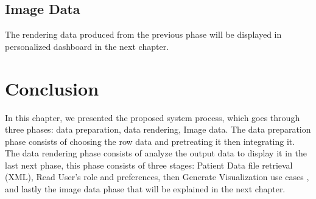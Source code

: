 \subsection{Image Data}
The rendering data produced from the previous phase will be displayed in  personalized dashboard in the next chapter.
\section{Conclusion}
In this chapter, we presented the proposed system process, which goes through three phases: data preparation, data rendering, Image data. The data preparation phase consists of choosing the row data and pretreating it then integrating it. The data rendering phase consists of analyze the output data to display it in the last next phase,  this phase consists of three stages:  Patient Data file retrieval (XML), Read User’s role and preferences, then Generate Visualization use cases , and lastly the image data phase that will be explained in the next chapter. 

